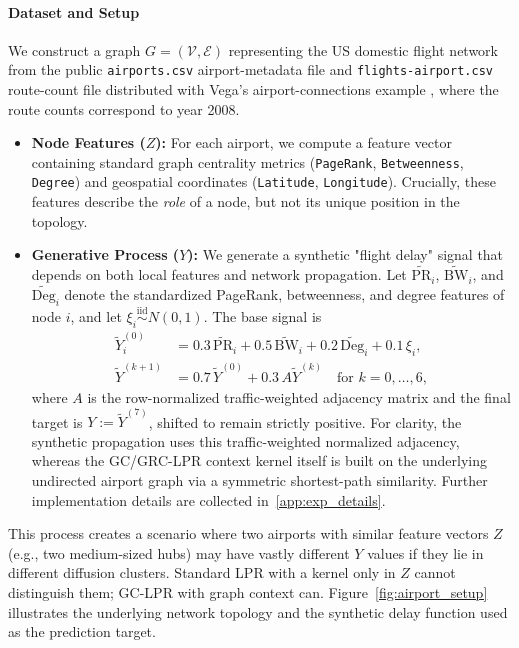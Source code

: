 \documentclass[final,1p,times,authoryear]{elsarticle}
\begin{document}
\paragraph{\textbf{Dataset and Setup}}
We construct a graph $G = (\mathcal{V}, \mathcal{E})$ representing the US domestic flight network from the public \texttt{airports.csv} airport-metadata file and \texttt{flights-airport.csv} route-count file distributed with Vega's airport-connections example \citep{vega_airports_2026,vega_flights_airport_2026}, where the route counts correspond to year 2008.
\begin{itemize}
    \item \textbf{Node Features ($Z$):} For each airport, we compute a feature vector containing standard graph centrality metrics (\texttt{PageRank}, \texttt{Betweenness}, \texttt{Degree}) and geospatial coordinates (\texttt{Latitude}, \texttt{Longitude}). Crucially, these features describe the \emph{role} of a node, but not its unique position in the topology.
    \item \textbf{Generative Process ($Y$):} We generate a synthetic "flight delay" signal that depends on both local features and network propagation. Let \(\widetilde{\mathrm{PR}}_i\), \(\widetilde{\mathrm{BW}}_i\), and \(\widetilde{\mathrm{Deg}}_i\) denote the standardized PageRank, betweenness, and degree features of node \(i\), and let \(\xi_i \stackrel{\mathrm{iid}}{\sim} N(0,1)\). The base signal is
    \begin{align*}
        \tilde{Y}^{(0)}_i &= 0.3\,\widetilde{\mathrm{PR}}_i + 0.5\,\widetilde{\mathrm{BW}}_i + 0.2\,\widetilde{\mathrm{Deg}}_i + 0.1\,\xi_i, \\
        \tilde{Y}^{(k+1)} &= 0.7\,\tilde{Y}^{(0)} + 0.3\,A\tilde{Y}^{(k)} \quad \text{for } k=0,\dots,6,
    \end{align*}
    where \(A\) is the row-normalized traffic-weighted adjacency matrix and the final target is \(Y := \tilde{Y}^{(7)}\), shifted to remain strictly positive. For clarity, the synthetic propagation uses this traffic-weighted normalized adjacency, whereas the GC/GRC-LPR context kernel itself is built on the underlying undirected airport graph via a symmetric shortest-path similarity. Further implementation details are collected in~\ref{app:exp_details}.
\end{itemize}

This process creates a scenario where two airports with similar feature vectors $Z$ (e.g., two medium-sized hubs) may have vastly different $Y$ values if they lie in different diffusion clusters. Standard LPR with a kernel only in $Z$ cannot distinguish them; GC-LPR with graph context can. Figure~\ref{fig:airport_setup} illustrates the underlying network topology and the synthetic delay function used as the prediction target.
\end{document}
